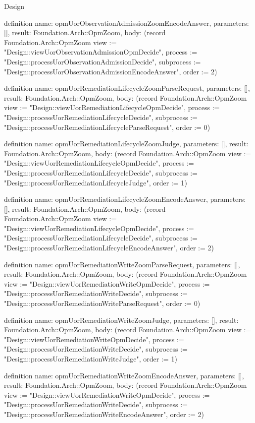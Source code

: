 \begin{lexlean}{Design}
\begin{semanticmodule}
definition{
  name: opmUorObservationAdmissionZoomEncodeAnswer,
  parameters: [],
  result: Foundation.Arch::OpmZoom,
  body: (record Foundation.Arch::OpmZoom {view := "Design::viewUorObservationAdmissionOpmDecide", process := "Design::processUorObservationAdmissionDecide", subprocess := "Design::processUorObservationAdmissionEncodeAnswer", order := 2})
}

definition{
  name: opmUorRemediationLifecycleZoomParseRequest,
  parameters: [],
  result: Foundation.Arch::OpmZoom,
  body: (record Foundation.Arch::OpmZoom {view := "Design::viewUorRemediationLifecycleOpmDecide", process := "Design::processUorRemediationLifecycleDecide", subprocess := "Design::processUorRemediationLifecycleParseRequest", order := 0})
}

definition{
  name: opmUorRemediationLifecycleZoomJudge,
  parameters: [],
  result: Foundation.Arch::OpmZoom,
  body: (record Foundation.Arch::OpmZoom {view := "Design::viewUorRemediationLifecycleOpmDecide", process := "Design::processUorRemediationLifecycleDecide", subprocess := "Design::processUorRemediationLifecycleJudge", order := 1})
}

definition{
  name: opmUorRemediationLifecycleZoomEncodeAnswer,
  parameters: [],
  result: Foundation.Arch::OpmZoom,
  body: (record Foundation.Arch::OpmZoom {view := "Design::viewUorRemediationLifecycleOpmDecide", process := "Design::processUorRemediationLifecycleDecide", subprocess := "Design::processUorRemediationLifecycleEncodeAnswer", order := 2})
}

definition{
  name: opmUorRemediationWriteZoomParseRequest,
  parameters: [],
  result: Foundation.Arch::OpmZoom,
  body: (record Foundation.Arch::OpmZoom {view := "Design::viewUorRemediationWriteOpmDecide", process := "Design::processUorRemediationWriteDecide", subprocess := "Design::processUorRemediationWriteParseRequest", order := 0})
}

definition{
  name: opmUorRemediationWriteZoomJudge,
  parameters: [],
  result: Foundation.Arch::OpmZoom,
  body: (record Foundation.Arch::OpmZoom {view := "Design::viewUorRemediationWriteOpmDecide", process := "Design::processUorRemediationWriteDecide", subprocess := "Design::processUorRemediationWriteJudge", order := 1})
}

definition{
  name: opmUorRemediationWriteZoomEncodeAnswer,
  parameters: [],
  result: Foundation.Arch::OpmZoom,
  body: (record Foundation.Arch::OpmZoom {view := "Design::viewUorRemediationWriteOpmDecide", process := "Design::processUorRemediationWriteDecide", subprocess := "Design::processUorRemediationWriteEncodeAnswer", order := 2})
}


\end{semanticmodule}
\end{lexlean}
